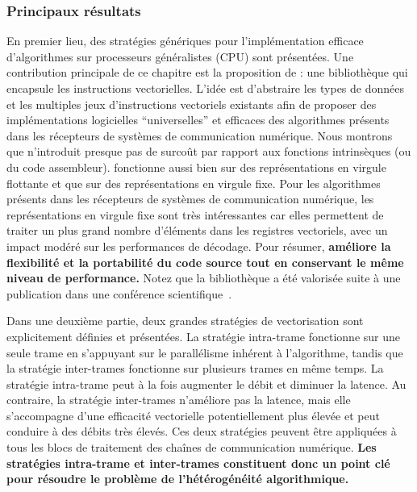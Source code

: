 \subsubsection*{Principaux résultats}

En premier lieu, des stratégies génériques pour l'implémentation efficace
d'algorithmes sur processeurs généralistes (CPU) sont présentées. Une
contribution principale de ce chapitre est la proposition de \MIPP : une
bibliothèque qui encapsule les instructions vectorielles. L'idée est d'abstraire
les types de données et les multiples jeux d’instructions vectoriels existants
afin de proposer des implémentations logicielles ``universelles'' et efficaces
des algorithmes présents dans les récepteurs de systèmes de communication
numérique. Nous montrons que \MIPP n'introduit presque pas de surcoût par
rapport aux fonctions intrinsèques (ou du code assembleur). \MIPP fonctionne
aussi bien sur des représentations en virgule flottante et que sur des
représentations en virgule fixe. Pour les algorithmes présents dans les
récepteurs de systèmes de communication numérique, les représentations en
virgule fixe sont très intéressantes car elles permettent de traiter un plus
grand nombre d'éléments dans les registres vectoriels, avec un impact modéré sur
les performances de décodage. Pour résumer, \textbf{\MIPP améliore la
flexibilité et la portabilité du code source tout en conservant le même niveau
de performance.} Notez que la bibliothèque \MIPP a été valorisée suite à une
publication dans une conférence scientifique~\cite{Cassagne2018}.

Dans une deuxième partie, deux grandes stratégies de vectorisation sont
explicitement définies et présentées. La stratégie intra-trame fonctionne
sur une seule trame en s'appuyant sur le parallélisme inhérent à l'algorithme,
tandis que la stratégie inter-trames fonctionne sur plusieurs trames en
même temps. La stratégie intra-trame peut à la fois augmenter le débit et
diminuer la latence. Au contraire, la stratégie inter-trames n'améliore pas la
latence, mais elle s'accompagne d'une efficacité vectorielle potentiellement
plus élevée et peut conduire à des débits très élevés. Ces deux stratégies
peuvent être appliquées à tous les blocs de traitement des chaînes de
communication numérique. \textbf{Les stratégies intra-trame et inter-trames
constituent donc un point clé pour résoudre le problème de l'hétérogénéité
algorithmique.}

